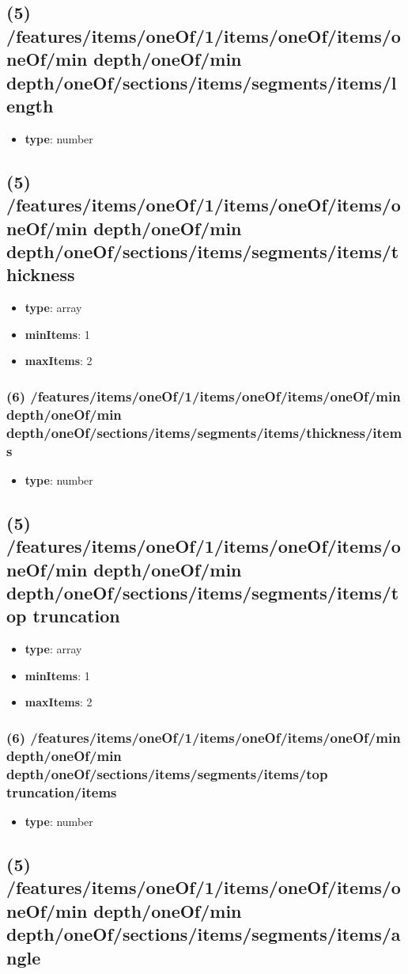 \subsection{(5) /features/items/oneOf/1/items/oneOf/items/oneOf/min depth/oneOf/min depth/oneOf/sections/items/segments/items/length}
\begin{itemize}[leftmargin=5em]\item {\bf type}: number
\end{itemize}\subsection{(5) /features/items/oneOf/1/items/oneOf/items/oneOf/min depth/oneOf/min depth/oneOf/sections/items/segments/items/thickness}
\begin{itemize}[leftmargin=5em]\item {\bf type}: array
\item {\bf minItems}: 1
\item {\bf maxItems}: 2
\end{itemize}\subsubsection{(6) /features/items/oneOf/1/items/oneOf/items/oneOf/min depth/oneOf/min depth/oneOf/sections/items/segments/items/thickness/items}
\begin{itemize}[leftmargin=6em]\item {\bf type}: number
\end{itemize}\subsection{(5) /features/items/oneOf/1/items/oneOf/items/oneOf/min depth/oneOf/min depth/oneOf/sections/items/segments/items/top truncation}
\begin{itemize}[leftmargin=5em]\item {\bf type}: array
\item {\bf minItems}: 1
\item {\bf maxItems}: 2
\end{itemize}\subsubsection{(6) /features/items/oneOf/1/items/oneOf/items/oneOf/min depth/oneOf/min depth/oneOf/sections/items/segments/items/top truncation/items}
\begin{itemize}[leftmargin=6em]\item {\bf type}: number
\end{itemize}\subsection{(5) /features/items/oneOf/1/items/oneOf/items/oneOf/min depth/oneOf/min depth/oneOf/sections/items/segments/items/angle}
